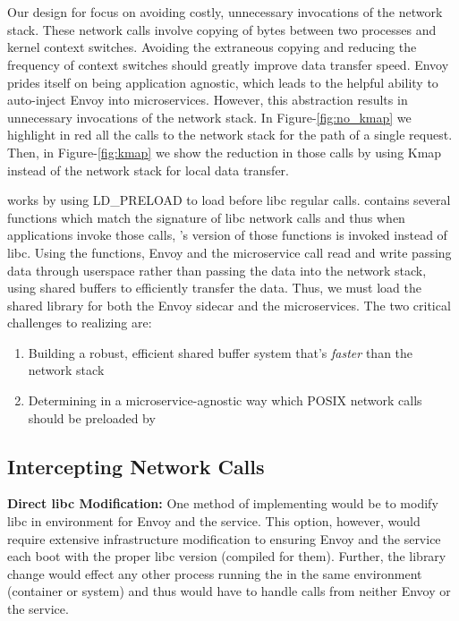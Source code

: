 \section{\sysname}
\label{sec:design}
Our design for \sysname focus on avoiding costly, unnecessary invocations of the network stack.
These network calls involve copying of bytes between two processes and kernel context switches.
Avoiding the extraneous copying and reducing the frequency of context switches should greatly improve data transfer speed.
Envoy prides itself on being application agnostic, which leads to the helpful ability to auto-inject Envoy into microservices.
However, this abstraction results in unnecessary invocations of the network stack.
In Figure-\ref{fig:no_kmap} we highlight in red all the calls to the network stack for the path of a single request.
Then, in Figure-\ref{fig:kmap} we show the reduction in those calls by using Kmap instead of the network stack for local data transfer.

\sysname works by using LD\_PRELOAD to load \sysname before libc regular calls.
\sysname contains several functions which match the signature of libc network calls and thus when applications invoke those calls, \sysname's version of those functions is invoked instead of libc.
Using the \sysname functions, Envoy and the microservice call read and write passing data through userspace rather than passing the data into the network stack, using shared buffers to efficiently transfer the data.
Thus, we must load the shared library for both the Envoy sidecar and the microservices.
The two critical challenges to realizing \sysname are:
\begin{enumerate}
    \item Building a robust, efficient shared buffer system that's \textit{faster} than the network stack
    \item Determining in a microservice-agnostic way which POSIX network calls should be preloaded by \sysname
\end{enumerate}

\subsection{Intercepting Network Calls}
\textbf{Direct libc Modification:}
One method of implementing \sysname would be to modify libc in environment for Envoy and the service.
This option, however, would require extensive infrastructure modification to ensuring Envoy and the service each boot with the proper libc version (compiled for them).
Further, the library change would effect any other process running the in the same environment (container or system) and thus \sysname would have to handle calls from neither Envoy or the service.

